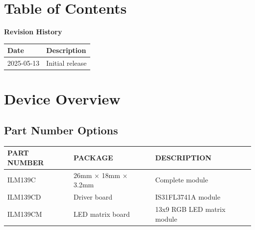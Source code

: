 \documentclass[10pt]{article}
\newcommand{\ReleaseDate}{2025-05-13}
\renewcommand{\contentsname}{Table of Contents}
\newcommand{\sectionbreak}{\clearpage}
\begin{document}
	\section*{\contentsname}
	\begin{multicols}{2}
		{\let\oldcontentsname\contentsname
			\renewcommand{\contentsname}{}
			\tableofcontents
			\let\contentsname\oldcontentsname}
	\end{multicols}
	
	\vspace{1em}
	\noindent\textbf{Revision History}\par
	\begin{tabularx}{\textwidth}{|l|X|}
		\hline
		\rowcolor{gray!25}\textbf{Date} & \textbf{Description} \\ \hline
		\ReleaseDate & Initial release \\ \hline
	\end{tabularx}
	\label{tab:rev}
	
	\sectionbreak
	
	\section{Device Overview}\label{sec:overview}
	\subsection{Part Number Options}\label{sec:overview.1}
	\begin{tabularx}{\textwidth}{|X|X|X|}
		\hline
		\rowcolor{gray!25}\textbf{PART NUMBER} & \textbf{PACKAGE} & \textbf{DESCRIPTION} \\ \hline
		ILM139C & 26mm × 18mm × 3.2mm & Complete module \\ \hline
		ILM139CD & Driver board & IS31FL3741A module \\ \hline
		ILM139CM & LED matrix board & 13x9 RGB LED matrix module \\ \hline
	\end{tabularx}
	\label{tab:overview1}
	\sectionbreak
\end{document}
